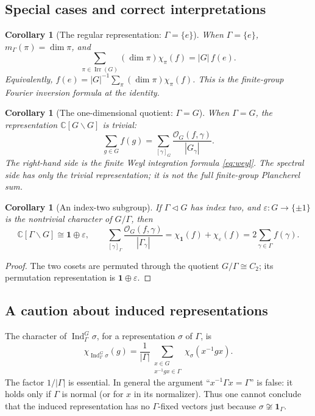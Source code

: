 \documentclass[12pt]{article}
\newtheorem{corollary}[theorem]{Corollary}
\theoremstyle{remark}
\newcommand{\C}{\mathbb C}
\newcommand{\Ind}{\operatorname{Ind}}
\newcommand{\id}{\mathbf 1}
\newcommand{\Irr}{\operatorname{Irr}}
\newcommand{\Orb}{\mathcal O}
\newcommand{\eps}{\varepsilon}
\begin{document}
\subsection{Special cases and correct interpretations}
\begin{corollary}[The regular representation: $\Gamma=\{e\}$]
When $\Gamma=\{e\}$, $m_\Gamma(\pi)=\dim\pi$, and
\begin{equation}\label{eq:reg}
 \sum_{\pi\in\Irr(G)}(\dim\pi)\chi_\pi(f)
  =|G|\,f(e).
\end{equation}
Equivalently, $f(e)=|G|^{-1}\sum_\pi (\dim\pi)\chi_\pi(f)$.
This is the finite-group Fourier inversion formula at the identity.
\end{corollary}
\begin{corollary}[The one-dimensional quotient: $\Gamma=G$]
When $\Gamma=G$, the representation $\C[G\backslash G]$ is trivial:
\begin{equation}\label{eq:gammaG}
 \sum_{g\in G}f(g)
 =\sum_{[\gamma]_G}\frac{\Orb_G(f,\gamma)}{|G_\gamma|}.
\end{equation}
The right-hand side is the finite Weyl integration formula
\eqref{eq:weyl}. The spectral side has \emph{only the trivial
representation}; it is not the full finite-group Plancherel sum.
\end{corollary}
\begin{corollary}[An index-two subgroup]\label{cor:index2}
If $\Gamma\lhd G$ has index two, and
$\eps:G\to\{\pm1\}$ is the nontrivial character of $G/\Gamma$,
then
\[
 \C[\Gamma\backslash G]\cong\id\oplus\eps,
 \qquad
 \sum_{[\gamma]_\Gamma}
     \frac{\Orb_G(f,\gamma)}{|\Gamma_\gamma|}
 =\chi_{\id}(f)+\chi_\eps(f)
 =2\sum_{\gamma\in\Gamma}f(\gamma).
\]
\end{corollary}
\begin{proof}
The two cosets are permuted through the quotient $G/\Gamma\cong C_2$;
its permutation representation is $\id\oplus\eps$.
\end{proof}

\subsection{A caution about induced representations}
The character of $\Ind_\Gamma^G\sigma$, for a representation
$\sigma$ of $\Gamma$, is
\begin{equation}\label{eq:indchar}
 \chi_{\Ind_\Gamma^G\sigma}(g)
  =\frac1{|\Gamma|}
    \sum_{\substack{x\in G\\x^{-1}gx\in\Gamma}}
       \chi_\sigma(x^{-1}gx).
\end{equation}
The factor $1/|\Gamma|$ is essential.  In general the argument
``$x^{-1}\Gamma x=\Gamma$'' is false: it holds only if $\Gamma$
is normal (or for $x$ in its normalizer).  Thus one cannot conclude
that the induced representation has no $\Gamma$-fixed vectors just
because $\sigma\not\cong\id_\Gamma$.
\end{document}
